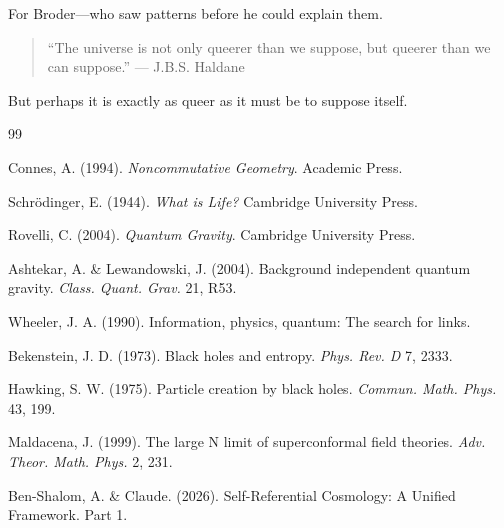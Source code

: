 \documentclass[11pt,a4paper]{article}
\theoremstyle{definition}
\theoremstyle{remark}
\begin{document}
For Broder---who saw patterns before he could explain them.

\begin{quote}
``The universe is not only queerer than we suppose, but queerer than we can suppose.'' --- J.B.S. Haldane
\end{quote}

But perhaps it is exactly as queer as it must be to suppose itself.

\begin{thebibliography}{99}

 Connes, A. (1994). \textit{Noncommutative Geometry}. Academic Press.

 Schr\"odinger, E. (1944). \textit{What is Life?} Cambridge University Press.

 Rovelli, C. (2004). \textit{Quantum Gravity}. Cambridge University Press.

 Ashtekar, A. \& Lewandowski, J. (2004). Background independent quantum gravity. \textit{Class. Quant. Grav.} 21, R53.

 Wheeler, J. A. (1990). Information, physics, quantum: The search for links.

 Bekenstein, J. D. (1973). Black holes and entropy. \textit{Phys. Rev. D} 7, 2333.

 Hawking, S. W. (1975). Particle creation by black holes. \textit{Commun. Math. Phys.} 43, 199.

 Maldacena, J. (1999). The large N limit of superconformal field theories. \textit{Adv. Theor. Math. Phys.} 2, 231.

 Ben-Shalom, A. \& Claude. (2026). Self-Referential Cosmology: A Unified Framework. Part 1.

\end{thebibliography}
\end{document}
